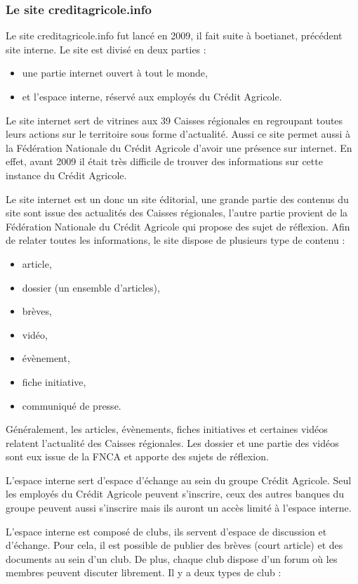 \documentclass[12pt,a4paper]{article}
\begin{document}
\subsubsection{Le site creditagricole.info}
Le site creditagricole.info fut lancé en 2009, il fait suite à boetianet, précédent site interne. Le site est divisé en deux parties :
\begin{itemize}
\item une partie internet ouvert à tout le monde,
\item et l'espace interne, réservé aux employés du Crédit Agricole.
\end{itemize}\par 
\medskip
Le site internet sert de vitrines aux 39 Caisses régionales en regroupant toutes leurs actions sur le territoire sous forme d'actualité. Aussi ce site permet aussi à la Fédération Nationale du Crédit Agricole d'avoir une présence sur internet. En effet, avant 2009 il était très difficile de trouver des informations sur cette instance du Crédit Agricole.\par
Le site internet est un donc un site éditorial, une grande partie des contenus du site sont issue des actualités des Caisses régionales, l'autre partie provient de la Fédération Nationale du Crédit Agricole qui propose des sujet de réflexion. Afin de relater toutes les informations, le site dispose de plusieurs type de contenu :
\begin{itemize}
\item article,
\item dossier (un ensemble d'articles),
\item brèves,
\item vidéo,
\item évènement,
\item fiche initiative,
\item communiqué de presse.
\end{itemize}\par
Généralement, les articles, évènements, fiches initiatives et certaines vidéos relatent l'actualité des Caisses régionales. Les dossier et une partie des vidéos sont eux issue de la FNCA et apporte des sujets de réflexion.\par
\bigskip
L'espace interne sert d'espace d'échange au sein du groupe Crédit Agricole. Seul les employés du Crédit Agricole peuvent s'inscrire, ceux des autres banques du groupe peuvent aussi s'inscrire mais ils auront un accès limité à l'espace interne.\par 
L'espace interne est composé de clubs, ils servent d'espace de discussion et d'échange. Pour cela, il est possible de publier des brèves (court article) et des documents au sein d'un club. De plus, chaque club dispose d'un forum où les membres peuvent discuter librement. Il y a deux types de club : 
\end{document}
